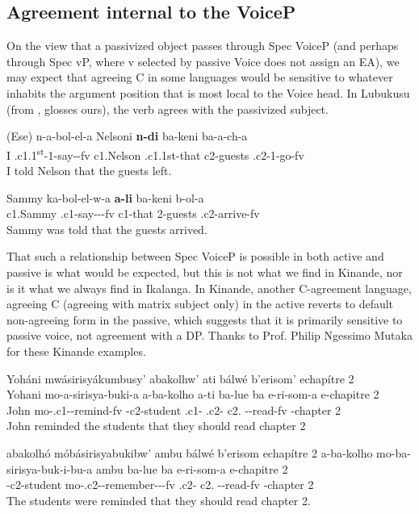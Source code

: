 \documentclass[output=paper,
modfonts
]{langscibook}
\begin{document}
\subsection{Agreement internal to the VoiceP}\label{s3.1}

On the view that a passivized object passes through Spec VoiceP (and perhaps through Spec vP, where v selected by passive Voice does not assign an EA), we may expect that agreeing C in some languages would be sensitive to whatever inhabits the argument position that is most local to the Voice head. In Lubukusu  (from \citealt[368]{Diercks2013}, glosses ours), the verb agrees with the passivized subject.

\ea\label{29}
\ea \gll (Ese) n-a-bol-el-a Nelsoni \textbf{n-di} ba-keni ba-a-ch-a \label{29a}\\
          I .c1.1\textsuperscript{st}-1-say--fv c1.Nelson .c1.1st-that c2-guests
          .c2-1-go-fv\\
		\glt I told Nelson that the guests left.

\ex \gll Sammy ka-bol-el-w-a \textbf{a-li} ba-keni b-ol-a\label{29b}\\
		c1.Sammy .c1-say---fv c1-that 2-guests .c2-arrive-fv\\
	\glt  Sammy was told that the guests arrived. \z\z

That such a relationship between Spec VoiceP is possible in both active and passive is what would be expected, but this is not what we find in Kinande, nor is it what we always find in Ikalanga. In Kinande, another C-agreement language, agreeing C (agreeing with matrix subject only) in the active reverts to default non-agreeing form in the passive, which suggests that it is primarily sensitive to passive voice, not agreement with a DP. Thanks to Prof. Philip Ngessimo Mutaka for these Kinande examples.

\ea \label{30}
\ea	Yoháni mwásirisyákumbusy’ 	abakolhw’ 	ati bálwé b’erisom’  echapítre 2\\
	\gll Yohani mo-a-sirisya-buki-a  a-ba-kolho a-ti ba-lue ba
    e-ri-som-a {e-chapitre 2}\\
	John     mo-.c1--remind-fv -c2-student .c1-    .c2- c2. 		--read-fv {-chapter 2} \\
	\glt John reminded the students that they should read chapter 2

\ex abakolhó móbásirisyabukibw’ ambu bálwé b’erisom echapítre 2
	\gll a-ba-kolho mo-ba-sirisya-buk-i-bu-a ambu   ba-lue ba
    e-ri-som-a {e-chapitre 2}\\
	-c2-student mo-.c2--remember---fv  .c2- c2. 	 --read-fv  {-chapter 2}\\
    \glt The students were reminded that they should read chapter 2.
    \z \z
\end{document}
